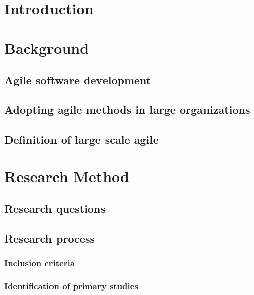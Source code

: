\documentclass{article}
\author{Ville Kumpulainen}
\begin{document}


\clearpage
{}

\clearpage
\begin{spacing}{0.9}
\tableofcontents
\end{spacing}

\setlength{\parskip}{7pt}
\clearpage

\clearpage
\section{Introduction}


\section{Background}

\subsection{Agile software development}

\subsection{Adopting agile methods in large organizations}

\subsection{Definition of large scale agile}


\section{Research Method}

\subsection{Research questions}

\subsection{Research process}

\subsubsection{Inclusion criteria}

\subsubsection{Identification of primary studies}

\end{document}
